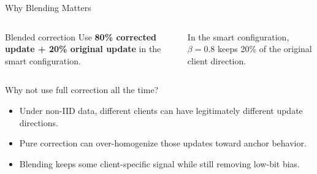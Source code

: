 \documentclass[aspectratio=169,11pt]{beamer}
\begin{document}
\begin{frame}{Why Blending Matters}
\begin{columns}[T,totalwidth=\textwidth]
\begin{block}{Blended correction}
Use \textbf{80\% corrected update + 20\% original update} in the smart
configuration.
\end{block}

\small
In the smart configuration, $\beta=0.8$ keeps 20\% of the original client
direction.
\end{columns}

\vspace{0.5em}
\begin{block}{Why not use full correction all the time?}
\begin{itemize}
  \item Under non-IID data, different clients can have legitimately different update directions.
  \item Pure correction can over-homogenize those updates toward anchor behavior.
  \item Blending keeps some client-specific signal while still removing low-bit bias.
\end{itemize}
\end{block}
\end{frame}
\end{document}
